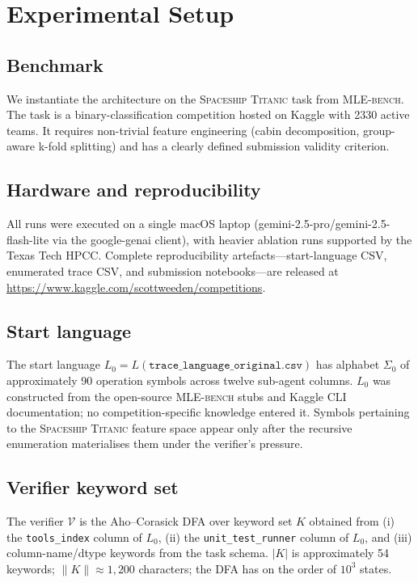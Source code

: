 \section{Experimental Setup}
\label{sec:expsetup}

\subsection{Benchmark}

We instantiate the architecture on the \textsc{Spaceship Titanic}
task from \textsc{MLE-bench}.  The task is a binary-classification
competition hosted on Kaggle with 2330 active teams.  It requires
non-trivial feature engineering (cabin decomposition, group-aware
k-fold splitting) and has a clearly defined submission validity
criterion.

\subsection{Hardware and reproducibility}

All runs were executed on a single macOS laptop
(gemini-2.5-pro/gemini-2.5-flash-lite via the google-genai client),
with heavier ablation runs supported by the Texas Tech HPCC.
Complete reproducibility artefacts---start-language CSV, enumerated
trace CSV, and submission notebooks---are released at
\url{https://www.kaggle.com/scottweeden/competitions}.

\subsection{Start language}

The start language $L_0 = L(\texttt{trace\_language\_original.csv})$
has alphabet $\Sigma_0$ of approximately 90 operation symbols across
twelve sub-agent columns.  $L_0$ was constructed from the
open-source \textsc{MLE-bench} stubs and Kaggle CLI documentation; no
competition-specific knowledge entered it.  Symbols pertaining to
the \textsc{Spaceship Titanic} feature space appear only after the
recursive enumeration materialises them under the verifier's
pressure.

\subsection{Verifier keyword set}

The verifier $\mathcal{V}$ is the Aho--Corasick DFA over keyword set
$K$ obtained from (i) the \texttt{tools\_index} column of $L_0$,
(ii) the \texttt{unit\_test\_runner} column of $L_0$, and (iii)
column-name/dtype keywords from the task schema.  $|K|$ is
approximately 54 keywords; $\|K\| \approx 1{,}200$ characters; the
DFA has on the order of $10^3$ states.

